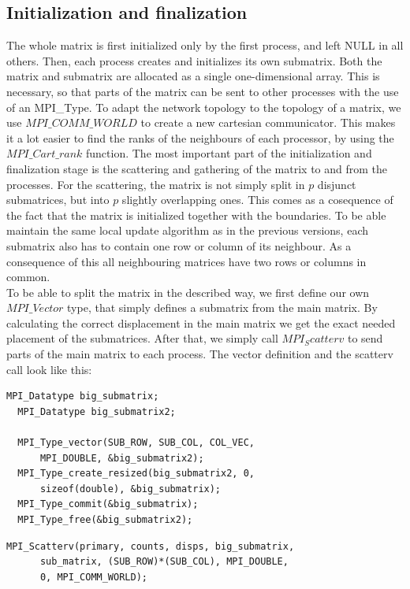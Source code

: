 \documentclass[11pt]{article}
\begin{document}
\subsection{Initialization and finalization}
The whole matrix is first initialized only by the first process, and left NULL in all others.
Then, each process creates and initializes its own submatrix. Both the matrix and submatrix are allocated as a single one-dimensional array. This is necessary, so that 
parts of the matrix can be sent to other processes with the use of an MPI\_Type. To adapt the network topology to the topology of a matrix, we use $MPI\_COMM\_WORLD$ to
create a new cartesian communicator. This makes it a lot easier to find the ranks of the neighbours of each processor, by using the $MPI\_Cart\_rank$ function.
The most important part of the initialization and finalization stage is the scattering and gathering of the matrix to and from the processes. For the scattering, the
matrix is not simply split in $p$ disjunct submatrices, but into $p$ slightly overlapping ones. This comes as a cosequence of the fact that the matrix is initialized together
with the boundaries. To be able maintain the same local update algorithm as in the previous versions, each submatrix also has to contain one row or column of its neighbour.
As a consequence of this all neighbouring matrices have two rows or columns in common.\\
To be able to split the matrix in the described way, we first define our own $MPI\_Vector$ type, that simply defines a submatrix from the main matrix. By calculating the
correct displacement in the main matrix we get the exact needed placement of the submatrices. After that, we simply call $MPI_Scatterv$ to send parts of the main matrix to each
process. The vector definition and the scatterv call look like this:
\begin{lstlisting}[label=some-code, caption=Vector type definition]
  MPI_Datatype big_submatrix;
  MPI_Datatype big_submatrix2;

  MPI_Type_vector(SUB_ROW, SUB_COL, COL_VEC, 
      MPI_DOUBLE, &big_submatrix2);
  MPI_Type_create_resized(big_submatrix2, 0, 
      sizeof(double), &big_submatrix);
  MPI_Type_commit(&big_submatrix);
  MPI_Type_free(&big_submatrix2);
\end{lstlisting}

	
\begin{lstlisting}[label=some-code, caption=$MPI\_Scatterv$ call]
  MPI_Scatterv(primary, counts, disps, big_submatrix, 
      sub_matrix, (SUB_ROW)*(SUB_COL), MPI_DOUBLE, 
      0, MPI_COMM_WORLD);
\end{lstlisting}
	
\end{document}
